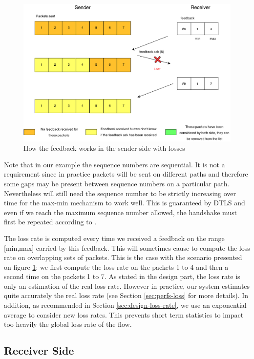 \begin{figure}[!ht]
\centering
\includegraphics[width=\textwidth]{images/Feedback-implem2.eps}
\caption{How the feedback works in the sender side with losses}
\label{fig:feedback-imp2}
\end{figure}

Note that in our example the sequence numbers are sequential. It is not a requirement since in practice packets will be sent on different paths and therefore some gaps may be present between sequence numbers on a particular path. Nevertheless will still need the sequence number to be strictly increasing over time for the max-min mechanism to work well. This is guaranteed by DTLS and even if we reach the maximum sequence number allowed, the handshake must first be repeated according to \cite{RFC5246}.

The loss rate is computed every time we received a feedback on the range [min,max] carried by this feedback. This will sometimes cause to compute the loss rate on overlapping sets of packets. This is the case with the scenario presented on figure \ref{fig:feedback-imp2}: we first compute the loss rate on the packets 1 to 4 and then a second time on the packets 1 to 7. As stated in the design part, the loss rate is only an estimation of the real loss rate. However in practice, our system estimates quite accurately the real loss rate (see Section \ref{sec:perfs-loss} for more details). In addition, as recommended in Section \ref{sec:design-loss-rate}, we use an exponential average to consider new loss rates. This prevents short term statistics to impact too heavily the global loss rate of the flow.

\subsection{Receiver Side}

